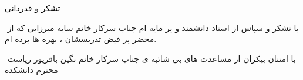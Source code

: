 \thispagestyle{empty}

\vspace{-1cm}
{\Large
\textcolor{black}{ تشکر و قدردانی}
}

{\color{black}
\vspace{1.0cm}
\begin{minipage}
{0.8\textwidth}
\baselineskip=1.8cm

-با تشکر و سپاس از استاد دانشمند و پر مایه ام جناب سرکار خانم سایه میرزایی که از محضر پر فیض تدریسشان ، بهره ها برده ام.

-با امتنان بیکران از مساعدت های بی شائبه ی جناب سرکار خانم نگین باقرپور ریاست محترم دانشکده


\end{minipage}
}
\clearpage
\thispagestyle{empty}
~~~
\clearpage
